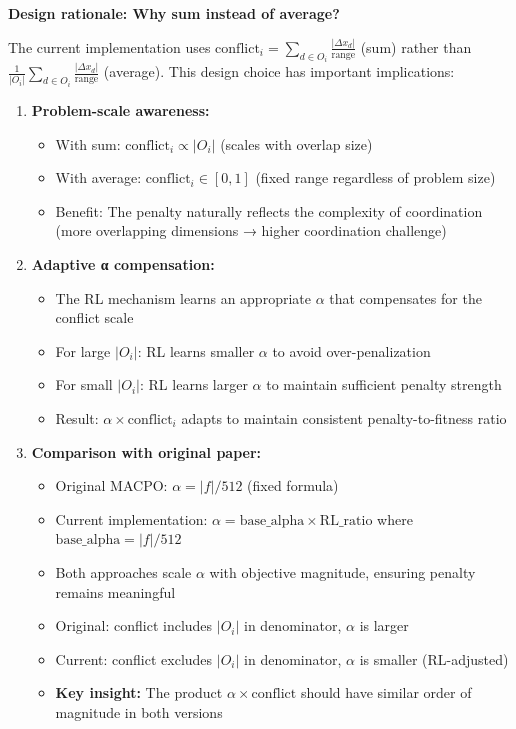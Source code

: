 \documentclass[11pt,a4paper]{article}
\begin{document}
\textbf{Design rationale: Why sum instead of average?}

The current implementation uses $\text{conflict}_i = \sum_{d \in O_i} \frac{|Δx_d|}{\text{range}}$ (sum) rather than $\frac{1}{|O_i|}\sum_{d \in O_i} \frac{|Δx_d|}{\text{range}}$ (average). This design choice has important implications:

\begin{enumerate}
    \item \textbf{Problem-scale awareness:}
    \begin{itemize}
        \item With sum: $\text{conflict}_i \propto |O_i|$ (scales with overlap size)
        \item With average: $\text{conflict}_i \in [0,1]$ (fixed range regardless of problem size)
        \item Benefit: The penalty naturally reflects the complexity of coordination (more overlapping dimensions → higher coordination challenge)
    \end{itemize}
    
    \item \textbf{Adaptive α compensation:}
    \begin{itemize}
        \item The RL mechanism learns an appropriate $\alpha$ that compensates for the conflict scale
        \item For large $|O_i|$: RL learns smaller $\alpha$ to avoid over-penalization
        \item For small $|O_i|$: RL learns larger $\alpha$ to maintain sufficient penalty strength
        \item Result: $\alpha \times \text{conflict}_i$ adapts to maintain consistent penalty-to-fitness ratio
    \end{itemize}
    
    \item \textbf{Comparison with original paper:}
    \begin{itemize}
        \item Original MACPO: $\alpha = |f| / 512$ (fixed formula)
        \item Current implementation: $\alpha = \text{base\_alpha} \times \text{RL\_ratio}$ where $\text{base\_alpha} = |f| / 512$
        \item Both approaches scale $\alpha$ with objective magnitude, ensuring penalty remains meaningful
        \item Original: conflict includes $|O_i|$ in denominator, $\alpha$ is larger
        \item Current: conflict excludes $|O_i|$ in denominator, $\alpha$ is smaller (RL-adjusted)
        \item \textbf{Key insight:} The product $\alpha \times \text{conflict}$ should have similar order of magnitude in both versions
    \end{itemize}
    

\end{enumerate}
\end{document}
